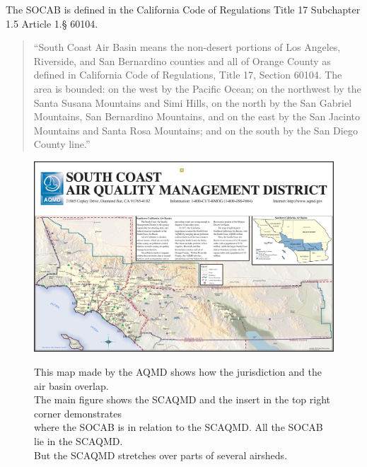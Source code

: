 The SOCAB is defined in the California Code of Regulations Title 17  Subchapter 1.5  Article 1.§ 60104.   
\begin{quote}
	``South Coast Air Basin means the non-desert portions of Los Angeles, Riverside, and San Bernardino counties and all of Orange County as defined in California Code of Regulations, Title 17, Section 60104. The area is bounded: on the west by the Pacific Ocean; on the northwest by the Santa Susana Mountains and Simi Hills, on the north by the San Gabriel Mountains, San Bernardino Mountains, and on the east by the San Jacinto Mountains and Santa Rosa Mountains; and on the south by the San Diego County line.''
	
\end{quote}

\begin{landscape}
	\begin{figure}[ht]
		\captionsetup{justification=centering}
		\caption{This map made by the \ac{AQMD} shows how the jurisdiction and the air basin overlap.\\  The main figure shows the \ac{SCAQMD} and the insert in the top right corner demonstrates \\where the \ac{SOCAB} is in relation to the \ac{SCAQMD}. All the \ac{SOCAB} lie in the \ac{SCAQMD}.\\ But the \ac{SCAQMD} stretches over parts of several airsheds.  
		}
		\centering
		\includegraphics[width = \textwidth]{Figures/map-of-jurisdiction.pdf}
		\label{fig:SCAQMD-jurisdiction}
	\end{figure}
\end{landscape}


